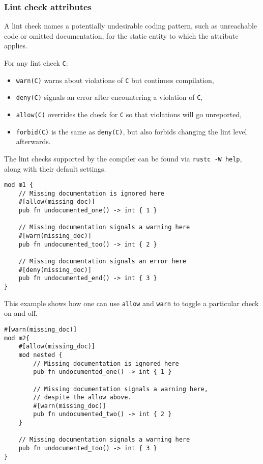 \documentclass[]{article}
\begin{document}
\subsubsection{Lint check attributes}\label{lint-check-attributes}

A lint check names a potentially undesirable coding pattern, such as
unreachable code or omitted documentation, for the static entity to
which the attribute applies.

For any lint check \texttt{C}:

\begin{itemize}
\itemsep1pt\parskip0pt
\item
  \texttt{warn(C)} warns about violations of \texttt{C} but continues
  compilation,
\item
  \texttt{deny(C)} signals an error after encountering a violation of
  \texttt{C},
\item
  \texttt{allow(C)} overrides the check for \texttt{C} so that
  violations will go unreported,
\item
  \texttt{forbid(C)} is the same as \texttt{deny(C)}, but also forbids
  changing the lint level afterwards.
\end{itemize}

The lint checks supported by the compiler can be found via
\texttt{rustc -W help}, along with their default settings.

\begin{verbatim}
mod m1 {
    // Missing documentation is ignored here
    #[allow(missing_doc)]
    pub fn undocumented_one() -> int { 1 }

    // Missing documentation signals a warning here
    #[warn(missing_doc)]
    pub fn undocumented_too() -> int { 2 }

    // Missing documentation signals an error here
    #[deny(missing_doc)]
    pub fn undocumented_end() -> int { 3 }
}
\end{verbatim}

This example shows how one can use \texttt{allow} and \texttt{warn} to
toggle a particular check on and off.

\begin{verbatim}
#[warn(missing_doc)]
mod m2{
    #[allow(missing_doc)]
    mod nested {
        // Missing documentation is ignored here
        pub fn undocumented_one() -> int { 1 }

        // Missing documentation signals a warning here,
        // despite the allow above.
        #[warn(missing_doc)]
        pub fn undocumented_two() -> int { 2 }
    }

    // Missing documentation signals a warning here
    pub fn undocumented_too() -> int { 3 }
}
\end{verbatim}
\end{document}
